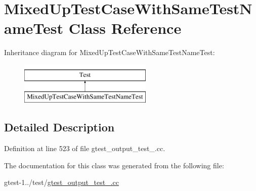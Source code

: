\hypertarget{classfoo_1_1MixedUpTestCaseWithSameTestNameTest}{\section{\-Mixed\-Up\-Test\-Case\-With\-Same\-Test\-Name\-Test \-Class \-Reference}
\label{db/dd4/classfoo_1_1MixedUpTestCaseWithSameTestNameTest}
}
\-Inheritance diagram for \-Mixed\-Up\-Test\-Case\-With\-Same\-Test\-Name\-Test\-:\begin{figure}[H]
\begin{center}
\leavevmode
\includegraphics[height=2.000000cm]{db/dd4/classfoo_1_1MixedUpTestCaseWithSameTestNameTest}
\end{center}
\end{figure}


\subsection{\-Detailed \-Description}


\-Definition at line 523 of file gtest\-\_\-output\-\_\-test\-\_\-.\-cc.



\-The documentation for this class was generated from the following file\-:\begin{DoxyCompactItemize}
\item 
gtest-\/1../test/\hyperlink{gtest__output__test___8cc}{gtest\-\_\-output\-\_\-test\-\_\-.\-cc}\end{DoxyCompactItemize}
